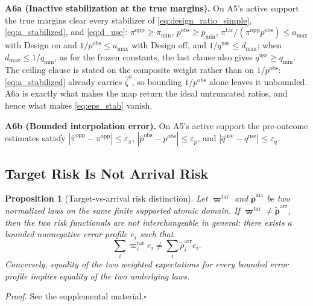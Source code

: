 \documentclass[letterpaper,journal]{IEEEtran}
\newtheorem{proposition}{Proposition}
\begin{document}
\noindent\textbf{A6a (Inactive stabilization at the true margins).}
On A5's active support the true margins clear every stabilizer of
\eqref{eq:design_ratio_simple}, \eqref{eq:a_stabilized}, and \eqref{eq:d_use}:
$\pi^{\mathrm{opp}}\ge\pi_{\min}$, $p^{\mathrm{obs}}\ge p_{\min}$,
$\pi^{\mathrm{tar}}/(\pi^{\mathrm{opp}}p^{\mathrm{obs}})\le a_{\max}$ with
Design on and $1/p^{\mathrm{obs}}\le a_{\max}$ with Design off, and
$1/q^{\mathrm{use}}\le d_{\max}$; when $d_{\max}\le1/q_{\min}$, as for the
frozen constants, the last clause also gives $q^{\mathrm{use}}\ge q_{\min}$.
The ceiling clause is stated on the composite weight rather than on
$1/p^{\mathrm{obs}}$: \eqref{eq:a_stabilized} already carries
$\widehat\zeta^{o}$, so bounding $1/p^{\mathrm{obs}}$ alone leaves it
unbounded.
A6a is exactly what makes the map return the ideal untruncated ratios, and
hence what makes \eqref{eq:eps_stab} vanish.

\noindent\textbf{A6b (Bounded interpolation error).}
On A5's active support the pre-outcome estimates satisfy
$|\widehat\pi^{\mathrm{opp}}-\pi^{\mathrm{opp}}|\le\varepsilon_\pi$,
$|\widehat p^{\mathrm{obs}}-p^{\mathrm{obs}}|\le\varepsilon_p$, and
$|\widehat q^{\mathrm{use}}-q^{\mathrm{use}}|\le\varepsilon_q$.

\subsection{Target Risk Is Not Arrival Risk}
\label{subsec:prop_risk}

\begin{proposition}[Target-vs-arrival risk distinction]
\label{prop:risk}
Let $\boldsymbol\varpi^{\mathrm{tar}}$ and
$\widetilde{\boldsymbol\rho}^{\mathrm{arr}}$ be two normalized laws on the same
finite supported atomic domain.  If
$\boldsymbol\varpi^{\mathrm{tar}}\neq\widetilde{\boldsymbol\rho}^{\mathrm{arr}}$,
then the two risk functionals are not interchangeable in general: there exists
a bounded nonnegative error profile $e_i$ such that
\begin{equation}
 \sum_i
 \varpi_i^{\mathrm{tar}}e_i
 \neq
 \sum_i
 \widetilde\rho_i^{\mathrm{arr}}e_i.
 \label{eq:prop1_nonidentity}
\end{equation}
Conversely, equality of the two weighted expectations for every bounded error
profile implies equality of the two underlying laws.
\end{proposition}

\noindent\emph{Proof.}
See the supplemental material.\hfill$\square$
\end{document}
